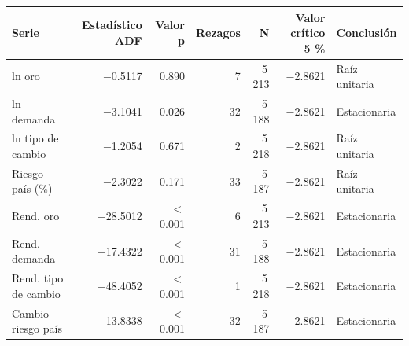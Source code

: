 \begin{tabularx}{\linewidth}{>{\raggedright\arraybackslash}Xrrrrrl}
\toprule
Serie & Estadístico ADF & Valor p & Rezagos & N & Valor crítico 5 \% & Conclusión \\
\midrule
ln oro & $-$0.5117 & 0.890 & 7 & 5\,213 & $-$2.8621 & Raíz unitaria \\
ln demanda & $-$3.1041 & 0.026 & 32 & 5\,188 & $-$2.8621 & Estacionaria \\
ln tipo de cambio & $-$1.2054 & 0.671 & 2 & 5\,218 & $-$2.8621 & Raíz unitaria \\
Riesgo país (\%) & $-$2.3022 & 0.171 & 33 & 5\,187 & $-$2.8621 & Raíz unitaria \\
Rend. oro & $-$28.5012 & $<$0.001 & 6 & 5\,213 & $-$2.8621 & Estacionaria \\
Rend. demanda & $-$17.4322 & $<$0.001 & 31 & 5\,188 & $-$2.8621 & Estacionaria \\
Rend. tipo de cambio & $-$48.4052 & $<$0.001 & 1 & 5\,218 & $-$2.8621 & Estacionaria \\
Cambio riesgo país & $-$13.8338 & $<$0.001 & 32 & 5\,187 & $-$2.8621 & Estacionaria \\
\bottomrule
\end{tabularx}
